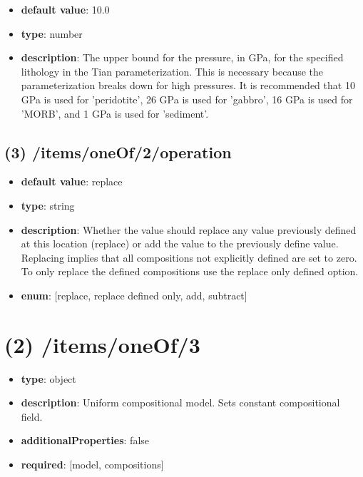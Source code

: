 \begin{itemize}[leftmargin=3em]\item {\bf default value}: 10.0
\item {\bf type}: number
\item {\bf description}: The upper bound for the pressure, in GPa, for the specified lithology in the Tian parameterization. This is necessary because the parameterization breaks down for high pressures. It is recommended that 10 GPa is used for 'peridotite', 26 GPa is used for 'gabbro', 16 GPa is used for 'MORB', and 1 GPa is used for 'sediment'.
\end{itemize}\subsection{(3) /items/oneOf/2/operation}
\begin{itemize}[leftmargin=3em]\item {\bf default value}: replace
\item {\bf type}: string
\item {\bf description}: Whether the value should replace any value previously defined at this location (replace) or add the value to the previously define value. Replacing implies that all compositions not explicitly defined are set to zero. To only replace the defined compositions use the replace only defined option.
\item {\bf enum}: [replace, replace defined only, add, subtract]\end{itemize}\section{(2) /items/oneOf/3}
\begin{itemize}[leftmargin=2em]\item {\bf type}: object
\item {\bf description}: Uniform compositional model. Sets constant compositional field.
\item {\bf additionalProperties}: false
\item {\bf required}: [model, compositions]\end{itemize}
